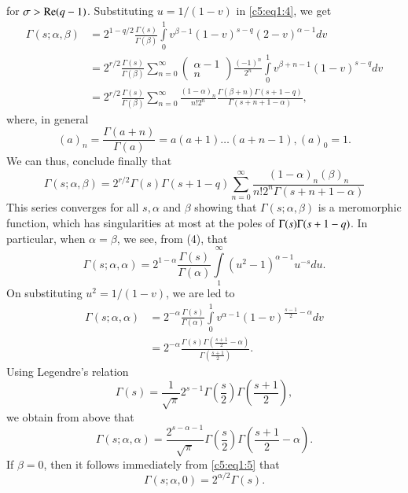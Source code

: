 for $\sigma > \operatorname{Re}(q-1)$. Substituting $u=1/(1-v)$ in \eqref{c5:eq1:4}, we get
\begin{align*}
\Gamma(s;\alpha,\beta) & = 2^{1-q/2} \frac{\Gamma(s)}{\Gamma(\beta)}
\int\limits^1_0 v^{\beta-1} (1-v)^{s-q} (2-v)^{\alpha-1} dv\\
& = 2^{r/2}
\frac{\Gamma(s)}{\Gamma(\beta)}\sum^{\infty}_{n=0} \begin{pmatrix}
\alpha-1\\n\end{pmatrix} \frac{(-1)^n}{2^n} \int\limits^1_0
v^{\beta+n-1} (1-v)^{s-q} dv\\
& = 2^{r/2} \frac{\Gamma(s)}{\Gamma(\beta)} \sum^{\infty}_{n=0}
\frac{(1-\alpha)_n}{n!2^n}
\frac{\Gamma(\beta+n)\Gamma(s+1-q)}{\Gamma(s+n+1-\alpha)}, 
\end{align*}
where, in general
$$
(a)_n = \frac{\Gamma(a+n)}{\Gamma(a)} = a(a+1) \ldots (a+n-1), (a)_0=1.
$$
We can thus, conclude finally that 
\begin{equation*}
\Gamma(s;\alpha,\beta) = 2^{r/2} \Gamma(s)\Gamma(s+1-q)
\sum^{\infty}_{n=0}
\frac{(1-\alpha)_n(\beta)_n}{n!2^n
\Gamma(s+n+1-\alpha)} \tag{5}\label{c5:eq1:5}
\end{equation*}
This series converges for all $s,\alpha$ and $\beta$ showing that
$\Gamma(s;\alpha,\beta)$ is a meromorphic function, which has
singularities at most at the poles of $\Gamma(s)\break\Gamma(s+1-q)$. In
particular, when $\alpha=\beta$, we see, from (4), that 
$$
\Gamma(s;\alpha,\alpha) = 2^{1-\alpha}
\frac{\Gamma(s)}{\Gamma(\alpha)} \int\limits^{\infty}_1
(u^2-1)^{\alpha-1} u^{-s} du.
$$
On substituting $u^2=1/(1-v)$, we are led to 
\begin{align*}
\Gamma(s;\alpha,\alpha) & = 2^{-\alpha}
\frac{\Gamma(s)}{\Gamma(\alpha)} \int\limits^1_0
v^{\alpha-1}(1-v)^{\frac{s-1}{2}-\alpha} dv\\
& = 2^{-\alpha}
\frac{\Gamma(s)\Gamma(\frac{s+1}{2}-\alpha)}{\Gamma(\frac{s+1}{2})}. 
\end{align*}
Using \pageoriginale Legendre's relation
$$
\Gamma(s) = \frac{1}{\surd\pi} 2^{s-1} \Gamma(\frac{s}{2})
\Gamma(\frac{s+1}{2}), 
$$
we obtain from above that 
\begin{equation*}
\Gamma(s;\alpha,\alpha) = \frac{2^{s-\alpha-1}}{\surd\pi}
\Gamma(\frac{s}{2}) \Gamma
(\frac{s+1}{2}-\alpha). \tag{6}\label{c5:eq1:6}
\end{equation*}
If $\beta=0$, then it follows immediately from \eqref{c5:eq1:5} that 
\begin{equation*}
\Gamma(s;\alpha,0) = 2^{\alpha/2} 
\Gamma(s). \tag{7}\label{c5:eq1:7}
\end{equation*}

